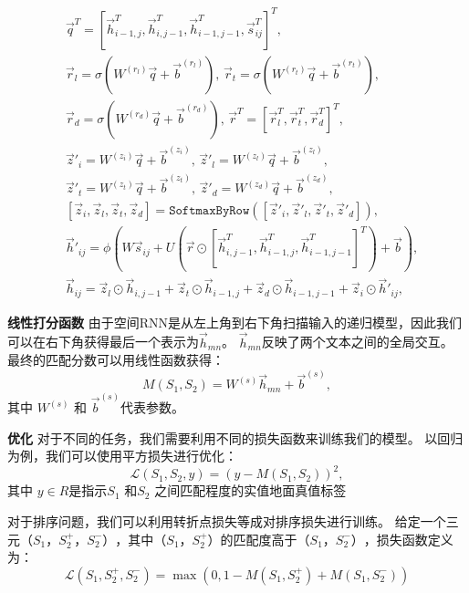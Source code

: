 \begin{align}\label{eq:SRNN}
&\vec{q}^T=[\vec{h}_{i-1,j}^T,\vec{h}_{i,j-1}^T,\vec{h}_{i-1,j-1}^T,\vec{s}_{ij}^T]^T,\nonumber\\
		&\vec{r}_l =\sigma(W^{(r_l)}\vec{q}+\vec{b}^{(r_l)}),\,\vec{r}_t =\sigma(W^{(r_t)}\vec{q}+\vec{b}^{(r_t)}),\nonumber\\
		&\vec{r}_d =\sigma(W^{(r_d)}\vec{q}+\vec{b}^{(r_d)}),\,\vec{r}^T  =[\vec{r}_l^T,\vec{r}_t^T,\vec{r}_d^T]^T,\nonumber\\
		&\vec{z}'_{i} = W^{(z_i)}\vec{q}+\vec{b}^{(z_i)},\,\vec{z}'_{l} =W^{(z_l)}\vec{q}+\vec{b}^{(z_l)},\nonumber\\
 		&\vec{z}'_{t} =W^{(z_t)}\vec{q}+\vec{b}^{(z_t)},\,\vec{z}'_{d}=W^{(z_d)}\vec{q}+\vec{b}^{(z_d)},\nonumber\\
 		&[\vec{z}_i, \vec{z}_l, \vec{z}_t, \vec{z}_{d}] = \texttt{SoftmaxByRow}([\vec{z}'_i, \vec{z}'_l, \vec{z}'_t, \vec{z}'_{d}]),\\
 		&\vec{h}'_{ij} {=}\phi(W\vec{s}_{ij} + U(\vec{r}\odot[\vec{h}_{i,j-1}^T, \vec{h}_{i-1,j}^T, \vec{h}_{i-1,j-1}^T]^T) + \vec{b}), \nonumber\\
 		&\vec{h}_{ij}     {=}\vec{z}_{l}\odot\vec{h}_{i,j-1}{+}\vec{z}_{t}\odot\vec{h}_{i-1,j}{+}
            		  \vec{z}_{d}\odot\vec{h}_{i-1,j-1}{+}\vec{z}_{i}\odot\vec{h}'_{ij},
	\end{align}

\textbf{线性打分函数}
由于空间RNN是从左上角到右下角扫描输入的递归模型，因此我们可以在右下角获得最后一个表示为$ \vec{h} _ {mn} $。 $ \vec{h} _ {mn} $反映了两个文本之间的全局交互。 最终的匹配分数可以用线性函数获得：
\begin{equation}
M(S_1,S_2)=W^{(s)}\vec{h}_{mn}+\vec{b}^{(s)},
\end{equation}
其中 $W^{(s)}$ 和 $\vec{b}^{(s)}$代表参数。

\textbf{优化}
对于不同的任务，我们需要利用不同的损失函数来训练我们的模型。
以回归为例，我们可以使用平方损失进行优化：
\begin{equation}
\mathcal{L}(S_1,S_2,y)= (y-M(S_1,S_2))^2,
\end{equation}
其中 $y\in R$是指示$S_1$ 和$S_2$ 之间匹配程度的实值地面真值标签

对于排序问题，我们可以利用转折点损失等成对排序损失进行训练。 给定一个三元$（S_1，S_2 ^ +，S_2 ^ - ）$，其中$（S_1，S_2 ^ +）$的匹配度高于$（S_1，S_2 ^ - ）$，损失函数定义为：
\begin{equation*}
\mathcal{L}(S_1, S_2^+, S_2^-) = \max(0, 1-M(S_1, S_2^+)+M(S_1, S_2^-))
\end{equation*}

